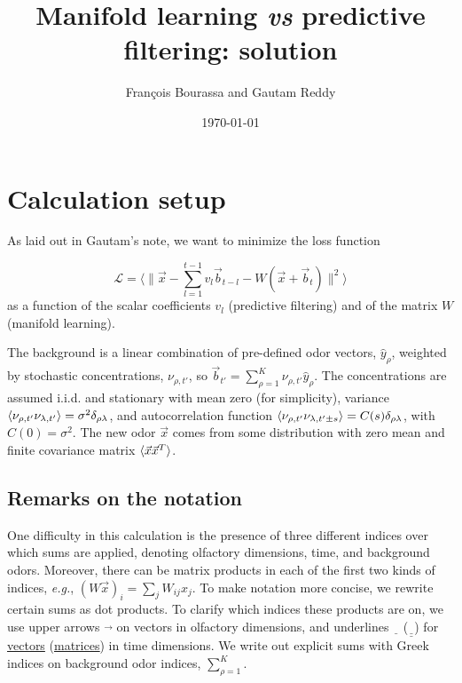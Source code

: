 \documentclass[letter, 12pt]{article}
\def\beq{ \begin{equation} }		%
\def\eeq{ \end{equation} } 			%
\def\eg{\textit{e.g.}, }
\newcommand{\dul}[1]{\underline{\underline{#1}}}
\begin{document}
\title{Manifold learning \textit{vs} predictive filtering: solution}
\author{François Bourassa and Gautam Reddy}
\date{\today}

\maketitle

\tableofcontents

\section{Calculation setup}
As laid out in Gautam's note, we want to minimize the loss function

\beq
	\mathcal{L} = \Big\langle{\Big\| \vec{x} - \sum_{l=1}^{t-1} v_l \vec{b}_{t-l} - W (\vec{x} + \vec{b}_t) \Big\|^2} \Big\rangle
	\label{eq:loss_def}
\eeq
 as a function of the scalar coefficients $v_l$ (predictive filtering) and of the matrix $W$ (manifold learning). 
 
 The background is a linear combination of pre-defined odor vectors, $\hat{y}_{\rho}$, weighted by stochastic concentrations,  $\nu_{\rho, t'}$, so $\vec{b}_{t'} = \sum_{\rho=1}^K \nu_{\rho, t'} \hat{y}_{\rho}$. The concentrations are assumed i.i.d. and stationary with mean zero (for simplicity), variance $\braket{\nu_{\rho, t'} \nu_{\lambda, t'}} = \sigma^2 \delta_{\rho \lambda}$, and autocorrelation function $\braket{\nu_{\rho, t'} \nu_{\lambda, t' \pm s}} = C(s) \delta_{\rho \lambda}$, with $C(0) = \sigma^2$. The new odor $\vec{x}$ comes from some distribution with zero mean and finite covariance matrix $\braket{\vec{x}\vec{x}^T}$. 
 
 
 \subsection{Remarks on the notation}
 One difficulty in this calculation is the presence of three different indices over which sums are applied, denoting olfactory dimensions, time, and background odors. Moreover, there can be matrix products in each of the first two kinds of indices, \eg $(W \vec{x})_i = \sum_{j} W_{ij} x_j$. To make notation more concise, we rewrite certain sums as dot products. To clarify which indices these products are on, we use upper arrows $\vec{\,\,\,}$ on vectors in olfactory dimensions, and underlines $\underline{\,\,\,}$ ($\dul{\,\,\,}$) for \underline{vectors} (\dul{matrices}) in time dimensions. We write out explicit sums with Greek indices on background odor indices, $\sum_{\rho=1}^K$. 
 
\end{document}

